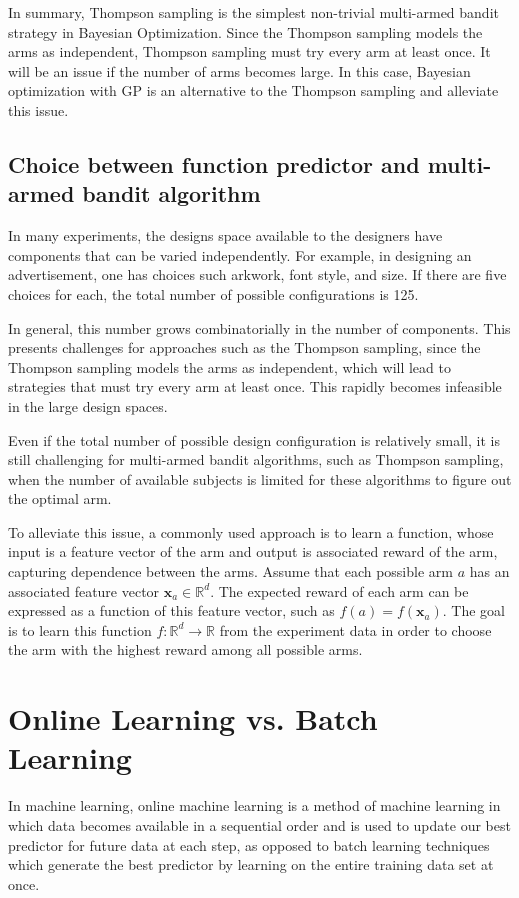 \documentclass{article}
\begin{document}
In summary, Thompson sampling is the simplest non-trivial multi-armed
bandit strategy in Bayesian Optimization. Since the Thompson sampling
models the arms as independent, Thompson sampling must try every arm
at least once. It will be an issue if the number of arms becomes
large. In this case, Bayesian optimization with GP is an alternative
to the Thompson sampling and alleviate this issue.

\subsection{Choice between function predictor and multi-armed bandit algorithm}
In many experiments, the designs space available to the designers have
components that can be varied independently. For example, in designing
an advertisement, one has choices such arkwork, font style, and
size. If there are five choices for each, the total number of possible
configurations is 125.

In general, this number grows combinatorially in the number of
components. This presents challenges for approaches such as the Thompson sampling, since the Thompson sampling models the arms as independent, which will lead
to strategies that must try every arm at least once. This rapidly
becomes infeasible in the large design spaces.

Even if the total number of possible design configuration is
relatively small, it is still challenging for multi-armed bandit
algorithms, such as Thompson sampling, when the number of available subjects is limited for these
algorithms to figure out the optimal arm.

To alleviate this issue, a commonly used approach is to learn a
function, whose input is a feature vector of the arm and output is
associated reward of the arm, capturing dependence between the arms. Assume that each possible arm $a$ has an
associated feature vector $\mathbf{x}_a\in \mathbb{R}^d$. The expected
reward of each arm can be expressed as a function of this feature
vector, such as $f(a) = f(\mathbf{x}_a)$. The goal is to learn this
function $f:\mathbb{R}^d \rightarrow \mathbb{R}$ from the experiment
data in order to choose the arm with the highest reward among all
possible arms.

\section{Online Learning vs. Batch Learning}
In machine learning, online machine learning is a method of machine
learning in which data becomes available in a sequential order and is
used to update our best predictor for future data at each step, as
opposed to batch learning techniques which generate the best predictor
by learning on the entire training data set at once.
\end{document}
